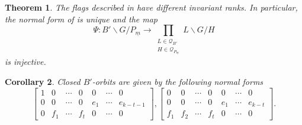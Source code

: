 \documentclass[pdftex]{sigma}
\numberwithin{equation}{section}
\newtheorem{Theorem}{Theorem}[section]
\newtheorem{Corollary}[Theorem]{Corollary}
\newtheorem{Proposition}[Theorem]{Proposition}
\theoremstyle{definition}
\newtheorem{Remark}[Theorem]{Remark}
\theoremstyle{plain}
\theoremstyle{plain}
\theoremstyle{plain}
\theoremstyle{plain}
\begin{document}
\begin{Theorem}
	The flags described in  have different invariant ranks. In particular, the normal form of  is unique and the map
	\begin{equation*}
		\Psi : B'\backslash G/P_{\underline m} \to \displaystyle \prod_{\substack{L \in \mathcal Q_{B'} \\ H \in \mathcal Q_{P_{\underline m}}}} L\backslash G/H
	\end{equation*}
	is injective.
\end{Theorem}


\begin{Corollary}
	Closed $B'$-orbits are given by the following normal forms
	\begin{equation*}
		\begin{bmatrix}
		1 & 0 & \cdots & 0 & 0 & \cdots & 0\\
		0 & 0 & \cdots & 0  & e_{1} & \cdots & e_{k-t-1} \\
		0 & f_{1} & \cdots & f_{t}  & 0 & \cdots & 0
	\end{bmatrix}, \begin{bmatrix}
		0 & 0 & \cdots & 0 & 0 & \cdots & 0\\
		0 & 0 & \cdots & 0  & e_{1} & \cdots & e_{k-t} \\
		f_{1} & f_{2} & \cdots & f_{t}  & 0 & \cdots & 0
	\end{bmatrix}.
	\end{equation*}
\end{Corollary}
\end{document}

